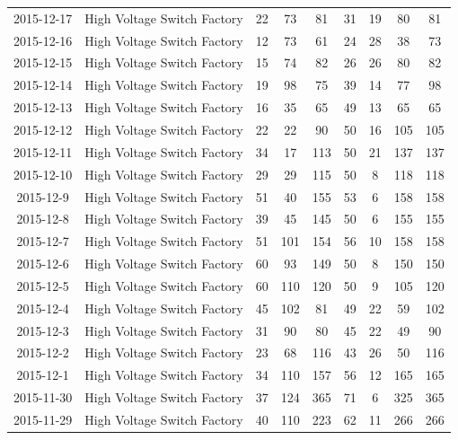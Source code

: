 \documentclass[a4paper,11pt]{article}
\begin{document}
\begin{appendices}
\begin{longtable}{ccccccccc}
    2015-12-17 & High Voltage Switch Factory & 22    & 73    & 81    & 31    & 19    & 80    & 81 \\
    2015-12-16 & High Voltage Switch Factory & 12    & 73    & 61    & 24    & 28    & 38    & 73 \\
    2015-12-15 & High Voltage Switch Factory & 15    & 74    & 82    & 26    & 26    & 80    & 82 \\
    2015-12-14 & High Voltage Switch Factory & 19    & 98    & 75    & 39    & 14    & 77    & 98 \\
    2015-12-13 & High Voltage Switch Factory & 16    & 35    & 65    & 49    & 13    & 65    & 65 \\
    2015-12-12 & High Voltage Switch Factory & 22    & 22    & 90    & 50    & 16    & 105   & 105 \\
    2015-12-11 & High Voltage Switch Factory & 34    & 17    & 113   & 50    & 21    & 137   & 137 \\
    2015-12-10 & High Voltage Switch Factory & 29    & 29    & 115   & 50    & 8     & 118   & 118 \\
    2015-12-9 & High Voltage Switch Factory & 51    & 40    & 155   & 53    & 6     & 158   & 158 \\
    2015-12-8 & High Voltage Switch Factory & 39    & 45    & 145   & 50    & 6     & 155   & 155 \\
    2015-12-7 & High Voltage Switch Factory & 51    & 101   & 154   & 56    & 10    & 158   & 158 \\
    2015-12-6 & High Voltage Switch Factory & 60    & 93    & 149   & 50    & 8     & 150   & 150 \\
    2015-12-5 & High Voltage Switch Factory & 60    & 110   & 120   & 50    & 9     & 105   & 120 \\
    2015-12-4 & High Voltage Switch Factory & 45    & 102   & 81    & 49    & 22    & 59    & 102 \\
    2015-12-3 & High Voltage Switch Factory & 31    & 90    & 80    & 45    & 22    & 49    & 90 \\
    2015-12-2 & High Voltage Switch Factory & 23    & 68    & 116   & 43    & 26    & 50    & 116 \\
    2015-12-1 & High Voltage Switch Factory & 34    & 110   & 157   & 56    & 12    & 165   & 165 \\
    2015-11-30 & High Voltage Switch Factory & 37    & 124   & 365   & 71    & 6     & 325   & 365 \\
    2015-11-29 & High Voltage Switch Factory & 40    & 110   & 223   & 62    & 11    & 266   & 266 \\

\end{longtable}
\end{appendices}
\end{document}
